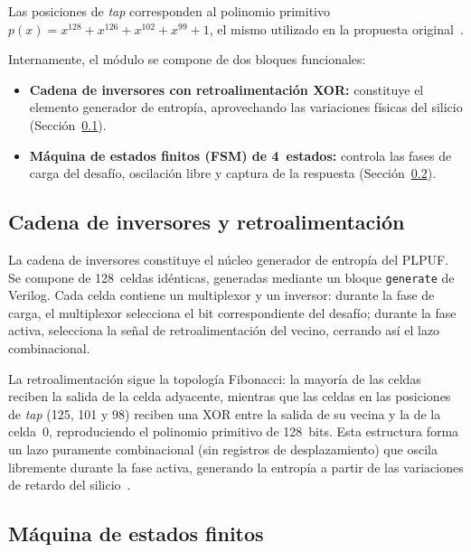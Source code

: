 Las posiciones de \textit{tap} corresponden al polinomio primitivo
$p(x) = x^{128} + x^{126} + x^{102} + x^{99} + 1$, el mismo utilizado en la
propuesta original~\cite{hori_2011_pseudolfsr}.

Internamente, el módulo se compone de dos bloques funcionales:

\begin{itemize}
  \item \textbf{Cadena de inversores con retroalimentación XOR:} constituye
    el elemento generador de entropía, aprovechando las variaciones físicas
    del silicio (Sección~\ref{sec:cadena}).
  \item \textbf{Máquina de estados finitos (FSM) de 4~estados:} controla las
    fases de carga del desafío, oscilación libre y captura de la respuesta
    (Sección~\ref{sec:fsm_impl}).
\end{itemize}

\subsection{Cadena de inversores y retroalimentación}
\label{sec:cadena}

La cadena de inversores constituye el núcleo generador de entropía del
PLPUF. Se compone de 128~celdas idénticas, generadas mediante un bloque
\texttt{generate} de Verilog. Cada celda contiene un multiplexor y un
inversor: durante la fase de carga, el multiplexor selecciona el bit
correspondiente del desafío; durante la fase activa, selecciona la señal de
retroalimentación del vecino, cerrando así el lazo combinacional.

La retroalimentación sigue la topología Fibonacci: la mayoría de las celdas
reciben la salida de la celda adyacente, mientras que las celdas en las
posiciones de \textit{tap} (125, 101 y 98) reciben una XOR entre la salida
de su vecina y la de la celda~0, reproduciendo el polinomio primitivo de
128~bits. Esta estructura forma un lazo puramente combinacional (sin
registros de desplazamiento) que oscila libremente durante la fase activa,
generando la entropía a partir de las variaciones de retardo del
silicio~\cite{hori_2011_pseudolfsr}.

\subsection{Máquina de estados finitos}
\label{sec:fsm_impl}


